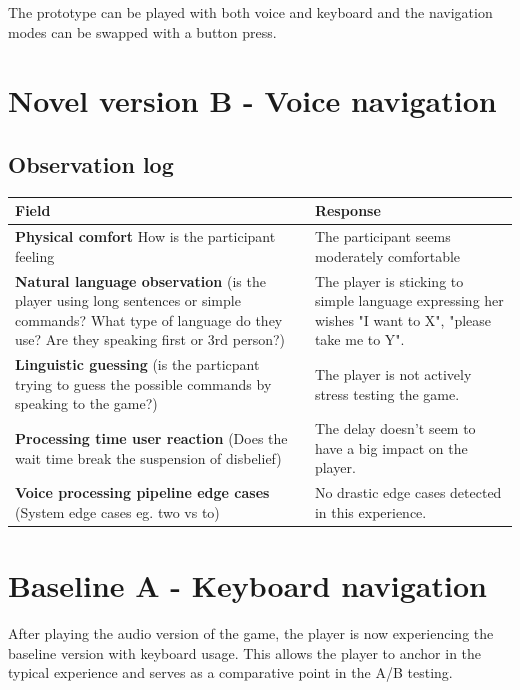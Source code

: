 The prototype can be played with both voice and keyboard and the navigation modes can be swapped with a button press. 


\section{Novel version B - Voice navigation}

\subsection{Observation log}
\begin{table}[H]
\centering
\begin{tabular}{|p{5cm}|p{10cm}|}
\hline
\textbf{Field} & \textbf{Response} \\ \hline
\textbf{Physical comfort} How is the participant feeling & The participant seems moderately comfortable  \\[1.5cm] \hline
\textbf{Natural language observation} (is the player using long sentences or simple commands? What type of language do they use? Are they speaking first or 3rd person?) & The player is sticking to simple language expressing her wishes "I want to X", "please take me to Y". \\[1.5cm] \hline
\textbf{Linguistic guessing} (is the particpant trying to guess the possible commands by speaking to the game?) & The player is not actively stress testing the game. \\[1.5cm] \hline
\textbf{Processing time user reaction} (Does the wait time break the suspension of disbelief) & The delay doesn't seem to have a big impact on the player. \\[1.5cm] \hline
\textbf{Voice processing pipeline edge cases} (System edge cases eg. two vs to)& No drastic edge cases detected in this experience. \\[1.5cm] \hline
\end{tabular}
\end{table}


\section{Baseline A - Keyboard navigation}
After playing the audio version of the game, the player is now experiencing the baseline version with keyboard usage.
This allows the player to anchor in the typical experience and serves as a comparative point in the A/B testing.

